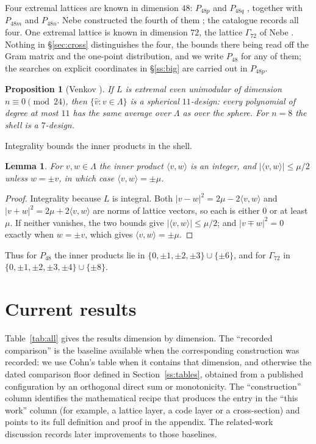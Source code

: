 \documentclass[11pt]{amsart}
\newtheorem{lemma}[theorem]{Lemma}
\newtheorem{proposition}[theorem]{Proposition}
\theoremstyle{remark}
\newcommand{\Pff}{P_{48}}
\newcommand{\Gsz}{\Gamma_{72}}
\newcommand{\ip}[2]{\langle #1,#2\rangle}
\begin{document}
Four extremal lattices are known in dimension $48$: $P_{48p}$ and $P_{48q}$
\cite[Ch.~7]{conway-sloane1999}, together with $P_{48m}$ and $P_{48n}$. Nebe
constructed the fourth of them \cite{nebe2014}; the catalogue
\cite{nebe-sloane} records all four. One extremal lattice is known in dimension
$72$, the lattice $\Gsz$ of Nebe \cite{nebe2012}. Nothing in \S\ref{sec:cross}
distinguishes the four, the bounds there being read off the Gram matrix and the
one-point distribution, and we write $\Pff$ for any of them; the searches on
explicit coordinates in \S\ref{ss:big} are carried out in $P_{48p}$.

\begin{proposition}[Venkov \cite{venkov1984}]\label{prop:venkov}
If $L$ is extremal even unimodular of dimension $n\equiv 0\pmod{24}$, then
$\{\hat v: v\in\Lambda\}$ is a spherical $11$-design: every polynomial of
degree at most $11$ has the same average over $\Lambda$ as over the sphere.
For $n=8$ the shell is a $7$-design.
\end{proposition}

Integrality bounds the inner products in the shell.

\begin{lemma}\label{lem:ips}
For $v,w\in\Lambda$ the inner product $\ip{v}{w}$ is an integer, and
$|\ip{v}{w}|\le\mu/2$ unless $w=\pm v$, in which case $\ip{v}{w}=\pm\mu$.
\end{lemma}

\begin{proof}
Integrality because $L$ is integral. Both $|v-w|^2=2\mu-2\ip{v}{w}$ and
$|v+w|^2=2\mu+2\ip{v}{w}$ are norms of lattice vectors, so each is either $0$ or
at least $\mu$. If neither vanishes, the two bounds give $|\ip{v}{w}|\le\mu/2$;
and $|v\mp w|^2=0$ exactly when $w=\pm v$, which gives $\ip{v}{w}=\pm\mu$.
\end{proof}

Thus for $\Pff$ the inner products lie in $\{0,\pm1,\pm2,\pm3\}\cup\{\pm6\}$, and
for $\Gsz$ in $\{0,\pm1,\pm2,\pm3,\pm4\}\cup\{\pm8\}$.

\section{Current results}

Table~\ref{tab:all} gives the results dimension by dimension. The ``recorded
comparison'' is the baseline available when the corresponding construction was
recorded: we use Cohn's table when it contains that dimension, and otherwise the
dated comparison floor defined in Section~\ref{ss:tables}, obtained from a
published configuration by an orthogonal direct sum or monotonicity. The
``construction'' column identifies the mathematical recipe that produces the
entry in the ``this work'' column (for example, a lattice layer, a code layer or
a cross-section) and points to its full definition and proof in the appendix.
The related-work discussion records later improvements to those baselines.
\end{document}
